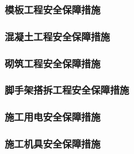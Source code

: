 \subsubsection{模板工程安全保障措施}

\subsubsection{混凝土工程安全保障措施}

\subsubsection{砌筑工程安全保障措施}

\subsubsection{脚手架搭拆工程安全保障措施}

\subsubsection{施工用电安全保障措施}

\subsubsection{施工机具安全保障措施}
